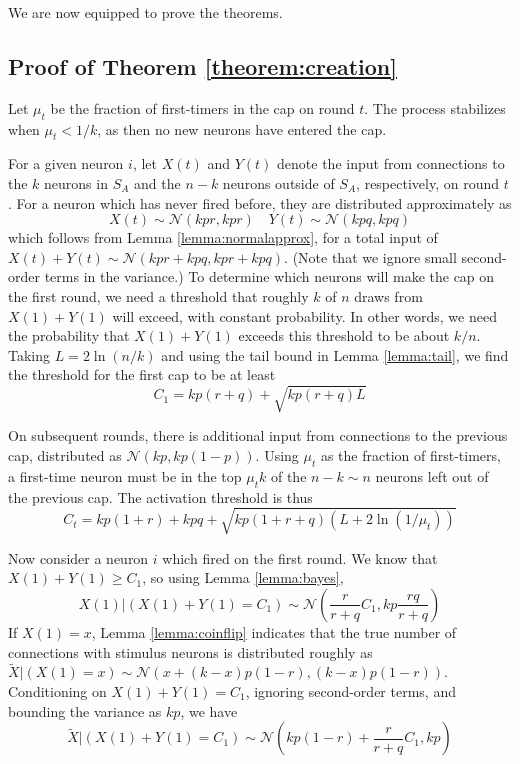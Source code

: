 \documentclass[final,12pt]{colt2022} %
\newcommand{\stimcore}[1]{S_{#1}}
\begin{document}
We are now equipped to prove the theorems.

\subsection*{Proof of Theorem \ref{theorem:creation}} \label{appendix:creation}
Let $\mu_t$ be the fraction of first-timers in the cap on round $t$. The process stabilizes when $\mu_t < 1/k$, as then no new neurons have entered the cap. 

For a given neuron $i$, let $X(t)$ and $Y(t)$ denote the input from connections to the $k$ neurons in $\stimcore{A}$ and the $n-k$ neurons outside of $\stimcore{A}$, respectively, on round $t$. For a neuron which has never fired before, they are distributed approximately as \[ X(t) \sim \mathcal N(kpr, kpr) \quad Y(t) \sim \mathcal N(kpq, kpq) \] which follows from Lemma \ref{lemma:normalapprox},
for a total input of $X(t) + Y(t) \sim \mathcal N(kpr + kpq, kpr + kpq)$. (Note that we ignore small second-order terms in the variance.) To determine which neurons will make the cap on the first round, we need a threshold that roughly $k$ of $n$ draws from $X(1) + Y(1)$ will exceed, with constant probability. In other words, we need the probability that $X(1) + Y(1)$ exceeds this threshold to be about $k/n$. Taking $L = 2\ln(n/k)$ and using the tail bound in Lemma \ref{lemma:tail}, we find the threshold for the first cap to be at least \[C_1 = kp(r + q) + \sqrt{kp(r + q)L}\]

On subsequent rounds, there is additional input from connections to the previous cap, distributed as $\mathcal N(kp, kp(1-p))$. Using $\mu_t$ as the fraction of first-timers, a first-time neuron must be in the top $\mu_tk$ of the $n-k \sim n$ neurons left out of the previous cap. The activation threshold is thus \[C_t = kp(1+r) + kpq + \sqrt{kp(1+r + q)(L + 2\ln(1/\mu_t))}\]

Now consider a neuron $i$ which fired on the first round. We know that $X(1) + Y(1) \ge C_1$, so using Lemma \ref{lemma:bayes}, \[X(1) | (X(1) + Y(1) = C_1) \sim \mathcal N\left(\frac{r}{r + q}C_1, kp\frac{rq}{r+q} \right)\] If $X(1) = x$, Lemma \ref{lemma:coinflip} indicates that the true number of connections with stimulus neurons is distributed roughly as $\tilde X | (X(1) = x) \sim \mathcal N(x + (k - x)p(1-r), (k - x)p(1-r))$. Conditioning on $X(1) + Y(1) = C_1$, ignoring second-order terms, and bounding the variance as $kp$, we have \[\tilde X | (X(1) + Y(1) = C_1) \sim \mathcal N\left(kp(1-r) + \frac{r}{r + q}C_1, kp\right)\]
\end{document}

